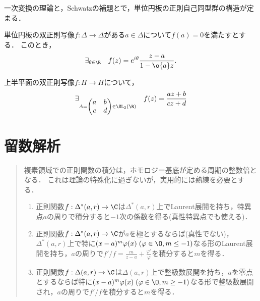 \documentclass[uplatex, dvipdfmx]{jsreport}
\begin{document}
\begin{tcolorbox}[colframe=ForestGreen, colback=ForestGreen!10!white,breakable,colbacktitle=ForestGreen!40!white,coltitle=black,fonttitle=\bfseries\sffamily,
title=]
    一次変換の理論と，Schwatzの補題とで，単位円板の正則自己同型群の構造が定まる．
\end{tcolorbox}

\begin{theorem}[単位円板の双正則写像は一次変換と回転の合成である]
    単位円板の双正則写像$f:\Delta\to\Delta$がある$a\in\Delta$について$f(a)=0$を満たすとする．
    このとき，
    \[\exists_{\theta\in\R}\quad f(z)=e^{i\theta}\frac{z-a}{1-\o{a}z}.\]
\end{theorem}

\begin{corollary}[上半平面の双正則写像は特殊線型群が定める一次変換である]
    上半平面の双正則写像$f:H\to H$について，
    \[\exists_{A=\begin{pmatrix}a&b\\c&d\end{pmatrix}\in\SL_2(\R)}\quad f(z)=\frac{az+b}{cz+d}\]
\end{corollary}

\chapter{留数解析}

\begin{quotation}
    複素領域での正則関数の積分は，ホモロジー基底が定める周期の整数倍となる．
    これは理論の特殊化に過ぎないが，実用的には熟練を必要とする．
    \begin{enumerate}
        \item 正則関数$f:\Delta^*(a,r)\to\C$は$\Delta^*(a,r)$上でLaurent展開を持ち，特異点$a$の周りで積分すると$-1$次の係数を得る(真性特異点でも使える)．
        \item 正則関数$f:\Delta^*(a,r)\to\C$が$a$を極とするならば(真性でない)，$\Delta^*(a,r)$上で特に$(x-a)^m\varphi(x)\;(\varphi\in\O,m\le-1)$なる形のLaurent展開を持ち，$a$の周りで$f'/f=\frac{m}{z-a}+\frac{\varphi'}{\varphi}$を積分すると$m$を得る．
        \item 正則関数$f:\Delta(a,r)\to\C$は$\Delta(a,r)$上で整級数展開を持ち，$a$を零点とするならば特に$(x-a)^m\varphi(x)\;(\varphi\in\O,m\ge-1)$なる形で整級数展開され，$a$の周りで$f'/f$を積分すると$m$を得る．
    \end{enumerate}
\end{quotation}
\end{document}
